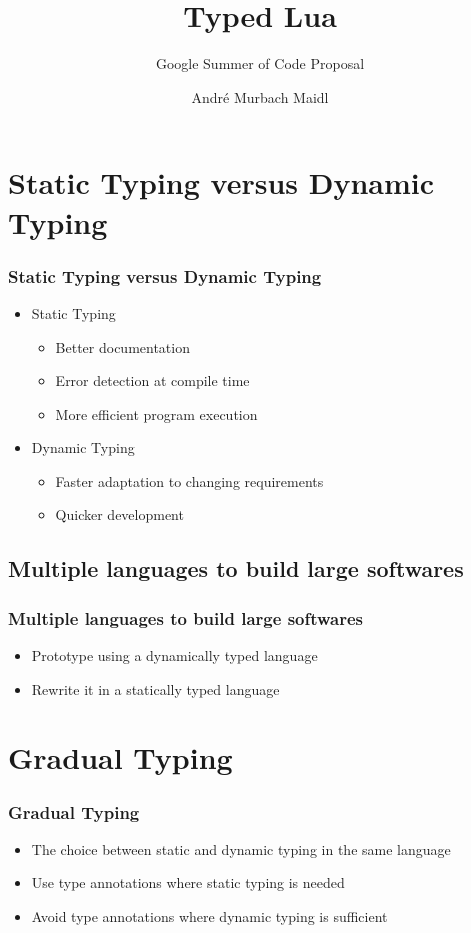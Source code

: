 \documentclass{beamer}
\begin{document}
\title{Typed Lua}
\subtitle{Google Summer of Code Proposal}
\author{André Murbach Maidl}
\date{}

\frame{\titlepage}

\section{Static Typing versus Dynamic Typing}
\begin{frame}
\frametitle{Static Typing versus Dynamic Typing}
\begin{itemize}
\item Static Typing
\begin{itemize}
\item Better documentation
\item Error detection at compile time
\item More efficient program execution
\end{itemize}
\item Dynamic Typing
\begin{itemize}
\item Faster adaptation to changing requirements
\item Quicker development
\end{itemize}
\end{itemize}
\end{frame}

\subsection{Multiple languages to build large softwares}
\begin{frame}
\frametitle{Multiple languages to build large softwares}
\begin{itemize}
\item Prototype using a dynamically typed language
\item Rewrite it in a statically typed language
\end{itemize}
\end{frame}

\section{Gradual Typing}
\begin{frame}
\frametitle{Gradual Typing}
\begin{itemize}
\item The choice between static and dynamic typing in the same language
\item Use type annotations where static typing is needed
\item Avoid type annotations where dynamic typing is sufficient
\end{itemize}
\end{frame}
\end{document}

